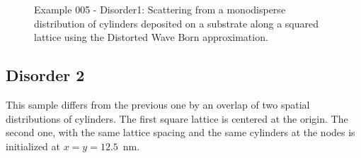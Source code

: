 \begin{figure}[H]
\hfill
{}
\hfill
{}
\hfill
\caption{Example 005 - Disorder1: Scattering from a monodisperse distribution of cylinders deposited on a substrate along a squared lattice using the Distorted Wave Born approximation.}
\label{fig:PythonEx5Dis1} 
\end{figure}

\subsection{Disorder 2}
This sample differs from the previous one by an overlap of two spatial distributions of cylinders. The first square lattice is centered at the origin. The second one, with the same lattice spacing and the same cylinders at the nodes is initialized at $x=y=12.5$~nm.

